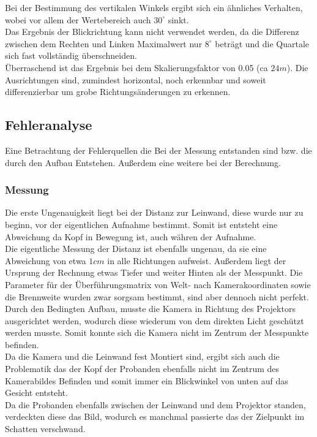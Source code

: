 Bei der Bestimmung des vertikalen Winkels ergibt sich ein ähnliches Verhalten, wobei vor allem der Wertebereich auch $30^\circ$ sinkt.\\
Das Ergebnis der Blickrichtung kann nicht verwendet werden, da die Differenz zwischen dem Rechten und Linken Maximalwert nur $8^\circ$ beträgt und die Quartale sich fast vollständig überschneiden.\\
Überraschend ist das Ergebnis bei dem Skalierungsfaktor von 0.05 (ca $24m$). Die Ausrichtungen sind, zumindest horizontal, noch erkennbar und soweit differenzierbar um grobe Richtungsänderungen zu erkennen. 
\subsection{Fehleranalyse}
Eine Betrachtung der Fehlerquellen die Bei der Messung entstanden sind bzw. die durch den Aufbau Entstehen. Außerdem eine weitere bei der Berechnung.
\subsubsection{Messung}
Die erste Ungenauigkeit liegt bei der Distanz zur Leinwand, diese wurde nur zu beginn, vor der eigentlichen Aufnahme bestimmt. Somit ist entsteht eine Abweichung da Kopf in Bewegung ist, auch währen der Aufnahme.\\
Die eigentliche Messung der Distanz ist ebenfalls ungenau, da sie eine Abweichung von etwa $1cm$ in alle Richtungen aufweist. Außerdem liegt der Ursprung der Rechnung etwas Tiefer und weiter Hinten als der Messpunkt.
Die Parameter für der Überführungsmatrix von Welt- nach Kamerakoordinaten sowie die Brennweite wurden zwar sorgsam bestimmt, sind aber dennoch nicht perfekt.\\
Durch den Bedingten Aufbau, musste die Kamera in Richtung des Projektors ausgerichtet werden, wodurch diese wiederum von dem direkten Licht geschützt werden musste. Somit konnte sich die Kamera nicht im Zentrum der Messpunkte befinden.\\
Da die Kamera und die Leinwand fest Montiert sind, ergibt sich auch die Problematik das der Kopf der Probanden ebenfalls nicht im Zentrum des Kamerabildes Befinden und somit immer ein Blickwinkel von unten auf das Gesicht entsteht.\\
Da die Probanden ebenfalls zwischen der Leinwand und dem Projektor standen, verdeckten diese das Bild, wodurch es manchmal passierte das der Zielpunkt im Schatten verschwand.
